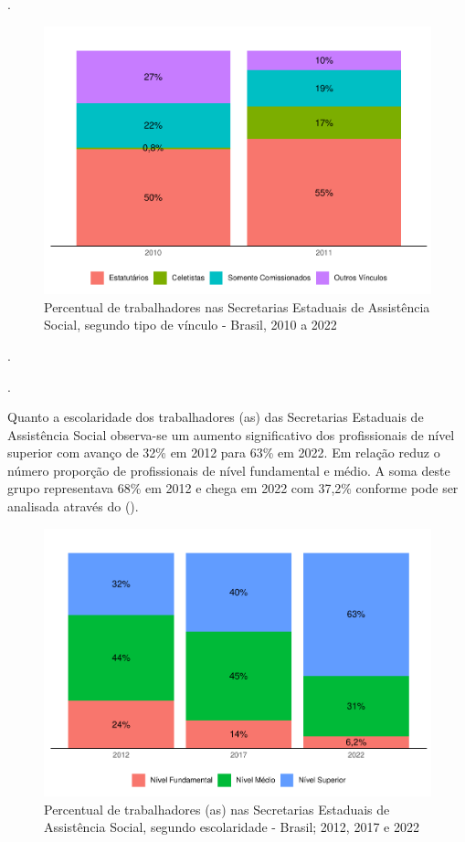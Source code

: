 \documentclass[
  brazilian]{report}
\begin{document}
.

\begin{figure}
\includegraphics{Censo-SUAS-2022_files/figure-latex/uf_trab_vin-1} \caption[Percentual de trabalhadores nas Secretarias Estaduais de Assistência Social, segundo tipo de vínculo - Brasil, 2010 a 2022]{Percentual de trabalhadores nas Secretarias Estaduais de Assistência Social, segundo tipo de vínculo - Brasil, 2010 a 2022}\label{fig:uf_trab_vin}
\end{figure}

.

.

Quanto a escolaridade dos trabalhadores (as) das Secretarias Estaduais
de Assistência Social observa-se um aumento significativo dos
profissionais de nível superior com avanço de 32\% em 2012 para 63\% em
2022. Em relação reduz o número proporção de profissionais de nível
fundamental e médio. A soma deste grupo representava 68\% em 2012 e
chega em 2022 com 37,2\% conforme pode ser analisada através do
().

\begin{figure}
\includegraphics{Censo-SUAS-2022_files/figure-latex/uf_trab_form-1} \caption[Percentual de trabalhadores (as) nas Secretarias Estaduais de Assistência Social, segundo escolaridade - Brasil]{Percentual de trabalhadores (as) nas Secretarias Estaduais de Assistência Social, segundo escolaridade - Brasil; 2012, 2017 e 2022}\label{fig:uf_trab_form}
\end{figure}
\end{document}
